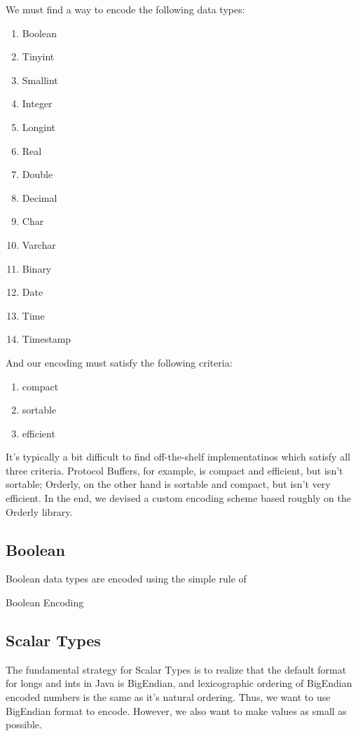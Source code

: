 We must find a way to encode the following data types:
\begin{enumerate}
	\item Boolean
	\item Tinyint
	\item Smallint
	\item Integer
	\item Longint
	\item Real
	\item Double
	\item Decimal
	\item Char
	\item Varchar
	\item Binary
	\item Date
	\item Time
	\item Timestamp
\end{enumerate}

And our encoding must satisfy the following criteria:

\begin{enumerate}
\item compact
\item sortable
\item efficient
\end{enumerate}

It's typically a bit difficult to find off-the-shelf implementatinos which satisfy all three criteria. Protocol Buffers, for example, is compact and efficient, but isn't sortable; Orderly, on the other hand is sortable and compact, but isn't very efficient. In the end, we devised a custom encoding scheme based roughly on the Orderly library.

\subsection{Boolean}
Boolean data types are encoded using the simple rule of

\begin{algorithm}
\caption{Boolean Encoding}
\end{algorithm}

\subsection{Scalar Types}
The fundamental strategy for Scalar Types is to realize that the default format for longs and ints in Java is BigEndian, and lexicographic ordering of BigEndian encoded numbers is the same as it's natural ordering. Thus, we want to use BigEndian format to encode. However, we also want to make values as small as possible. 

